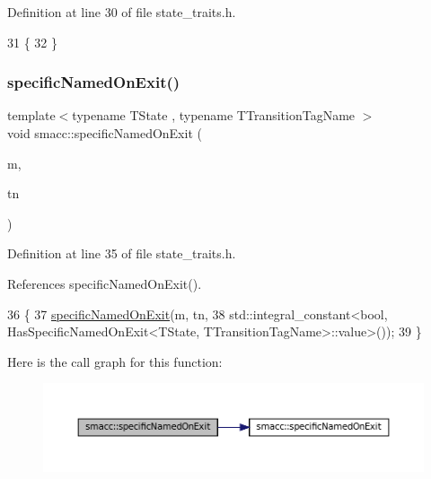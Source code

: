 Definition at line 30 of file state\+\_\+traits.\+h.


\begin{DoxyCode}
31     \{
32     \}
\end{DoxyCode}
\mbox{\label{namespacesmacc_ad462e5c9a025fe42bb06de617fabeaa5}} 
\subsubsection{\texorpdfstring{specific\+Named\+On\+Exit()}{specificNamedOnExit()}\hspace{0.1cm}{\footnotesize\ttfamily [3/3]}}
{\footnotesize\ttfamily template$<$typename T\+State , typename T\+Transition\+Tag\+Name $>$ \\
void smacc\+::specific\+Named\+On\+Exit (\begin{DoxyParamCaption}\item[{T\+State \&}]{m,  }\item[{T\+Transition\+Tag\+Name}]{tn }\end{DoxyParamCaption})}



Definition at line 35 of file state\+\_\+traits.\+h.



References specific\+Named\+On\+Exit().


\begin{DoxyCode}
36     \{
37         \hyperlink{namespacesmacc_ad462e5c9a025fe42bb06de617fabeaa5}{specificNamedOnExit}(m, tn,
38                             std::integral\_constant<\textcolor{keywordtype}{bool}, HasSpecificNamedOnExit<TState,
       TTransitionTagName>::value>());
39     \}
\end{DoxyCode}
Here is the call graph for this function\+:
\nopagebreak
\begin{figure}[H]
\begin{center}
\leavevmode
\includegraphics[width=350pt]{namespacesmacc_ad462e5c9a025fe42bb06de617fabeaa5_cgraph}
\end{center}
\end{figure}
\mbox{\label{namespacesmacc_ab3aebd999834404be47a62ea03aacfc9}} 

